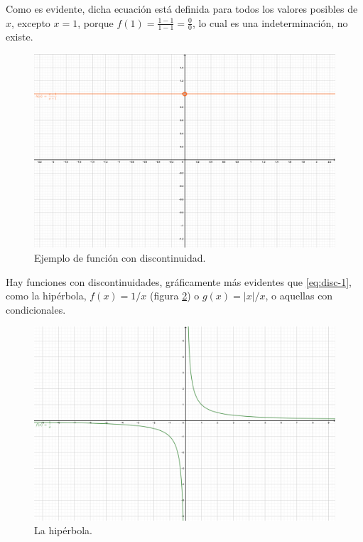 \documentclass[
]{book}
\begin{document}
Como es evidente, dicha ecuación está definida para todos los valores posibles de \(x\), excepto \(x = 1\), porque \(f(1) = \frac{1 - 1}{1-1} = \frac{0}{0}\), lo cual es una indeterminación, no existe.

\begin{figure}

{\centering \includegraphics[width=41.67in]{Unidad-III/Func-discont} 

}

\caption{Ejemplo de función con discontinuidad.}\label{fig:discont}
\end{figure}

Hay funciones con discontinuidades, gráficamente más evidentes que \eqref{eq:disc-1}, como la hipérbola, \(f(x) = 1/x\) (figura \ref{fig:hiperb}) o \(g(x) = |x|/x\), o aquellas con condicionales.

\begin{figure}

{\centering \includegraphics[width=41.67in]{Unidad-III/Hiperbola} 

}

\caption{La hipérbola.}\label{fig:hiperb}
\end{figure}
\end{document}
